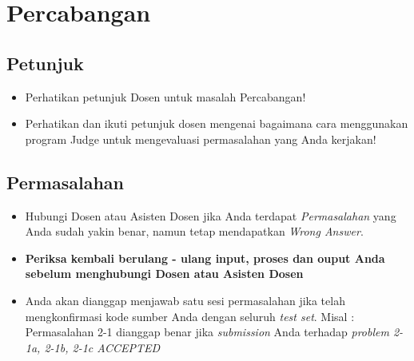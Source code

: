 \chapter{Percabangan}

\section{Petunjuk}
\begin{itemize}
	\item Perhatikan petunjuk Dosen untuk masalah Percabangan!
	\
	\item Perhatikan dan ikuti petunjuk dosen mengenai bagaimana cara menggunakan program Judge untuk mengevaluasi permasalahan yang Anda kerjakan!

\end{itemize}

\newpage
\section{Permasalahan}
\begin{itemize}

		\item Hubungi Dosen atau Asisten Dosen jika Anda terdapat \textit{Permasalahan} yang Anda sudah yakin benar, namun tetap mendapatkan \textit{Wrong Answer}. 
		\item \textbf{Periksa kembali berulang - ulang input, proses dan ouput Anda sebelum menghubungi Dosen atau Asisten Dosen}
		
		\item Anda akan dianggap menjawab satu sesi permasalahan jika telah mengkonfirmasi kode sumber Anda dengan seluruh \textit{test set}. Misal : Permasalahan 2-1 dianggap benar jika \textit{submission} Anda terhadap \textit{problem 2-1a, 2-1b, 2-1c ACCEPTED}
		
\end{itemize}


